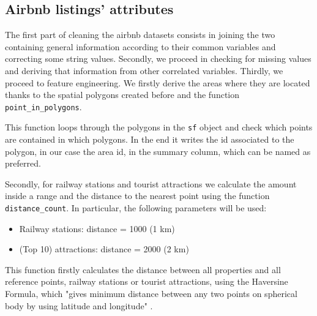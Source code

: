 \subsection{Airbnb listings' attributes}

The first part of cleaning the airbnb datasets consists in joining the two containing general information according to their common variables and correcting some string values.
Secondly, we proceed in checking for missing values and deriving that information from other correlated variables.
Thirdly, we proceed to feature engineering.
We firstly derive the areas where they are located thanks to the spatial polygons created before and the function \texttt{point\_in\_polygons}.



This function loops through the polygons in the \texttt{sf} object and check which points are contained in which polygons. In the end it writes the id associated to the polygon, in our case the area id, in the summary column, which can be named as preferred.

Secondly, for railway stations and tourist attractions we calculate the amount inside a range and the distance to the nearest point using the function \texttt{distance\_count}. In particular, the following parameters will be used:

\begin{itemize}

    \item Railway stations: distance = 1000 (1 km)

    \item (Top 10) attractions: distance = 2000 (2 km)
    
\end{itemize}



This function firstly calculates the distance between all properties and all reference points, railway stations or tourist attractions, using the Haversine Formula, which "gives  minimum  distance  between  any  two  points  on  spherical body by using latitude and longitude" \citep{haversine:2013}.

